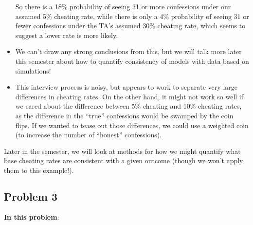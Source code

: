 \documentclass[
  letterpaper,
  DIV=11,
  numbers=noendperiod]{scrartcl}
\begin{document}
\begin{itemize}
  So there is a 18\% probability of seeing 31 or more confessions under
  our assumed 5\% cheating rate, while there is only a 4\% probability
  of seeing 31 or fewer confessions under the TA's assumed 30\% cheating
  rate, which seems to suggest a lower rate is more likely.
\item
  We can't draw any strong conclusions from this, but we will talk more
  later this semester about how to quantify consistency of models with
  data based on simulations!
\item
  This interview process is noisy, but appears to work to separate very
  large differences in cheating rates. On the other hand, it might not
  work so well if we cared about the difference between 5\% cheating and
  10\% cheating rates, as the difference in the ``true'' confessions
  would be swamped by the coin flips. If we wanted to tease out those
  differences, we could use a weighted coin (to increase the number of
  ``honest'' confessions).
\end{itemize}

Later in the semester, we will look at methods for how we might quantify
what base cheating rates are consistent with a given outcome (though we
won't apply them to this example!).

\subsection{Problem 3}\label{problem-3}

\textbf{In this problem}:
\end{document}
